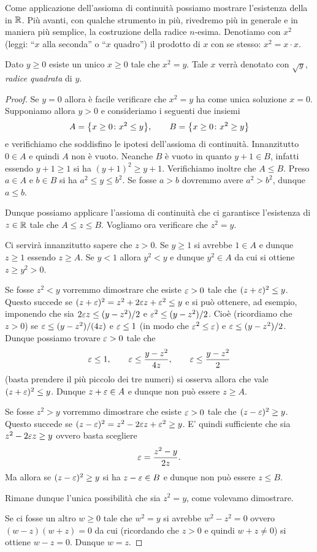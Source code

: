 Come applicazione dell'assioma di continuità possiamo mostrare l'esistenza
della  in $\mathbb R$.
Più avanti, con qualche strumento in più, rivedremo più in generale
e in maniera più semplice, la costruzione della radice $n$-esima.
Denotiamo con $x^2$ (leggi: ``$x$ alla seconda'' o ``$x$ quadro'') il prodotto di $x$ con se stesso: $x^2 = x\cdot x$.

\begin{theorem}
\label{th:radice_quadrata}%
%
\mymark{***}%
Dato $y\ge 0$ esiste un unico $x\ge 0$ tale che $x^2=y$.
Tale $x$ verrà denotato con $\sqrt y$, \emph{radice quadrata} di $y$.
\mymargin{$\sqrt{\cdot}$}
\end{theorem}
\begin{proof}
\mymark{*}
Se $y=0$ allora è facile verificare che $x^2=y$ ha come unica soluzione $x=0$.
Supponiamo allora $y>0$ e
consideriamo i seguenti due insiemi
\[
  A = {\left\{ x\ge 0 \colon x^2 \le y \right\}},\qquad
  B = {\left\{ x\ge 0 \colon x^2 \ge y \right\}}
\]
e verifichiamo che soddisfino le ipotesi dell'assioma di continuità.
Innanzitutto $0\in A$ e quindi $A$ non è vuoto.
Neanche $B$ è vuoto in quanto $y+1\in B$,
infatti essendo $y+1\ge 1$ si ha
$(y+1)^2 \ge y+1$. Verifichiamo inoltre che $A \le B$.
Preso $a\in A$ e $b\in B$ si ha $a^2 \le y \le b^2$.
Se fosse $a>b$ dovremmo avere $a^2>b^2$, dunque $a \le b$.

Dunque possiamo applicare l'assioma di continuità
che ci garantisce l'esistenza di $z\in \mathbb R$ tale che $A \le z \le B$.
Vogliamo ora verificare che $z^2 = y$.

Ci servirà innanzitutto sapere che $z>0$. Se $y\ge 1$ si avrebbe $1\in A$
e dunque $z\ge 1$ essendo $z\ge A$. Se $y<1$ allora $y^2 < y$ e dunque $y^2 \in A$
da cui si ottiene $z\ge y^2 > 0$.

Se fosse $z^2 < y$ vorremmo dimostrare che esiste $\varepsilon>0$ tale che
$(z+\varepsilon)^2 \le y$.
Questo succede se $(z+\varepsilon)^2 = z^2 + 2 \varepsilon z + \varepsilon^2 \le y$
e si può ottenere, ad esempio,
imponendo che sia $2\varepsilon z \le (y-z^2)/2$ e $\varepsilon^2 \le (y-z^2)/2$.
Cioè (ricordiamo che $z>0$) se $\varepsilon \le (y-z^2)/(4z)$ e $\varepsilon \le 1$
(in modo che $\varepsilon^2 \le \varepsilon$)
e $\varepsilon \le (y-z^2)/2$. Dunque possiamo
trovare $\varepsilon>0$
tale che
\[
\varepsilon \le 1, \qquad
\varepsilon \le \frac{y-z^2}{4z}, \qquad
\varepsilon \le \frac{y-z^2}2
\]
(basta prendere il più piccolo dei tre numeri)
si osserva allora
che vale $(z+\varepsilon)^2\le y$.
Dunque $z+\varepsilon \in A$ e dunque non può essere $z\ge A$.

Se fosse $z^2 > y$ vorremmo dimostrare che esiste $\varepsilon>0$ tale che
$(z-\varepsilon)^2 \ge y$.
Questo succede se $(z-\varepsilon)^2 = z^2 - 2\varepsilon z + \varepsilon^2 \ge y$.
E' quindi sufficiente che sia $z^2 - 2 \varepsilon z \ge y$ ovvero basta scegliere
\[
  \varepsilon = \frac{z^2-y}{2z}.
\]
Ma allora se $(z-\varepsilon)^2\ge y$ si ha $z-\varepsilon \in B$ e dunque non può
essere $z \le B$.

Rimane dunque l'unica possibilità che sia $z^2 = y$, come volevamo dimostrare.

Se ci fosse un altro $w\ge 0$ tale che $w^2 = y$ si avrebbe $w^2 - z^2=0$ ovvero
$(w-z)(w+z)=0$ da cui (ricordando che $z>0$ e quindi $w+z\neq 0$)
si ottiene $w-z=0$. Dunque $w=z$.
\end{proof}

